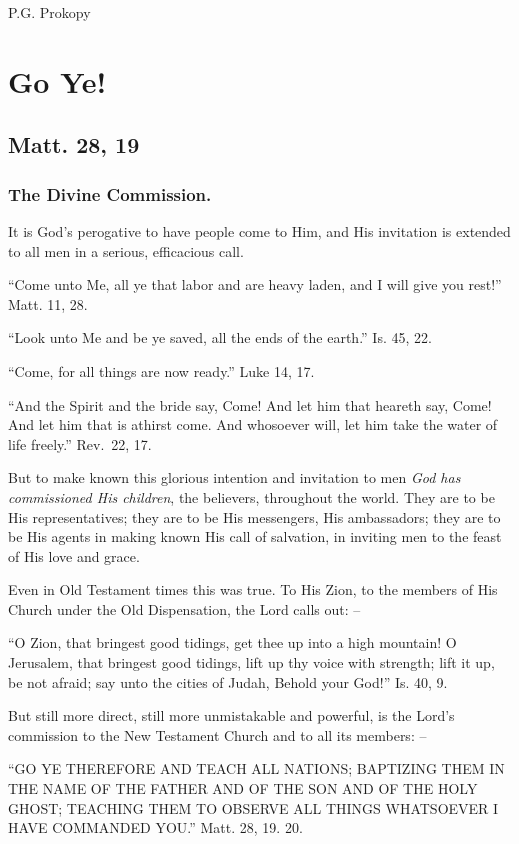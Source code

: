 \documentclass[
]{book}
\begin{document}
P.G. Prokopy

\chapter{Go Ye!}\label{go-ye}

\section*{Matt. 28, 19}\label{matt.-28-19}

\subsection*{The Divine Commission.}\label{the-divine-commission.}

It is God's perogative to have people come to Him, and His invitation is extended to all men in a serious, efficacious call.

``Come unto Me, all ye that labor and are heavy laden, and I will give you rest!'' Matt. 11, 28.

``Look unto Me and be ye saved, all the ends of the earth.'' Is. 45, 22.

``Come, for all things are now ready.'' Luke 14, 17.

``And the Spirit and the bride say, Come! And let him that heareth say, Come! And let him that is athirst come. And whosoever will, let him take the water of life freely.'' Rev.~22, 17.

But to make known this glorious intention and invitation to men \emph{God has commissioned His children}, the believers, throughout the world. They are to be His representatives; they are to be His messengers, His ambassadors; they are to be His agents in making known His call of salvation, in inviting men to the feast of His love and grace.

Even in Old Testament times this was true. To His Zion, to the members of His Church under the Old Dispensation, the Lord calls out: --

``O Zion, that bringest good tidings, get thee up into a high mountain! O Jerusalem, that bringest good tidings, lift up thy voice with strength; lift it up, be not afraid; say unto the cities of Judah, Behold your God!'' Is. 40, 9.

But still more direct, still more unmistakable and powerful, is the Lord's commission to the New Testament Church and to all its members: --

``GO YE THEREFORE AND TEACH ALL NATIONS; BAPTIZING THEM IN THE NAME OF THE FATHER AND OF THE SON AND OF THE HOLY GHOST; TEACHING THEM TO OBSERVE ALL THINGS WHATSOEVER I HAVE COMMANDED YOU.'' Matt. 28, 19. 20.
\end{document}
